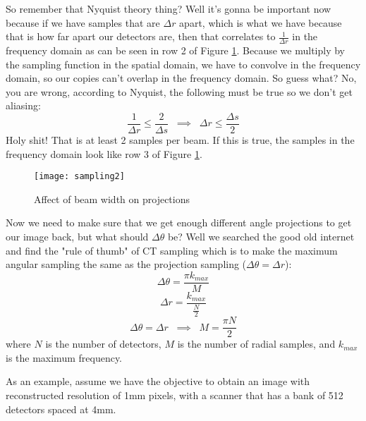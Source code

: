So remember that Nyquist theory thing? Well it's gonna be important now because if we have samples that are $\Delta r$ apart, which is what we have because that is how far apart our detectors are, then that correlates to $\frac{1}{\Delta r}$ in the frequency domain as can be seen in row 2 of Figure \ref{fig:ct:samp2}. Because we multiply by the sampling function in the spatial domain, we have to convolve in the frequency domain, so our copies can't overlap in the frequency domain. So guess what? No, you are wrong, according to Nyquist, the following must be true so we don't get aliasing:
\begin{equation}
\frac{1}{\Delta r} \leq \frac{2}{\Delta s} \; \; \implies \; \; \Delta r \leq \frac{\Delta s}{2}
\end{equation}
Holy shit! That is at least 2 samples per beam. If this is true, the samples in the frequency domain look like row 3 of Figure \ref{fig:ct:samp2}.
\begin{figure}[h]
	\centering
	\texttt{[image: sampling2]}
	\caption{Affect of beam width on projections}
	\label{fig:ct:samp2}
\end{figure}
Now we need to make sure that we get enough different angle projections to get our image back, but what should $\Delta \theta$ be? Well we searched the good old internet and find the "rule of thumb" of CT sampling which is to make the maximum angular sampling the same as the projection sampling ($\Delta \theta = \Delta r$):
\begin{equation}
\Delta \theta = \frac{\pi k_{max}}{M}
\end{equation}
\begin{equation}
\Delta r = \frac{k_{max}}{\frac{N}{2}} 
\end{equation}
\begin{equation}
\Delta \theta = \Delta r \; \; \implies \; \; M = \frac{\pi N}{2}
\end{equation}
where $N$ is the number of detectors, $M$ is the number of radial samples, and $k_{max}$ is the maximum frequency. 

As an example, assume we have the objective to obtain an image with reconstructed resolution of 1mm pixels, with a scanner that has a bank of 512 detectors spaced at 4mm.